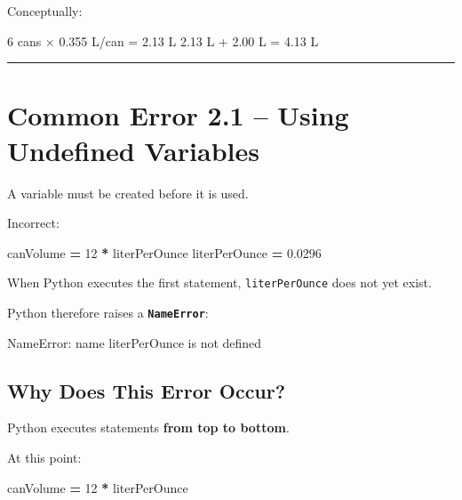 \documentclass[
]{article}
\newenvironment{Shaded}{\begin{snugshade}}{\end{snugshade}}
\newcommand{\DecValTok}[1]{\textcolor[rgb]{0.00,0.00,0.81}{#1}}
\newcommand{\FloatTok}[1]{\textcolor[rgb]{0.00,0.00,0.81}{#1}}
\newcommand{\NormalTok}[1]{#1}
\newcommand{\OperatorTok}[1]{\textcolor[rgb]{0.81,0.36,0.00}{\textbf{#1}}}
\begin{document}
Conceptually:

\begin{Shaded}
\begin{Highlighting}[]
\NormalTok{6 cans × 0.355 L/can = 2.13 L}
\NormalTok{2.13 L + 2.00 L       = 4.13 L}
\end{Highlighting}
\end{Shaded}

\begin{center}\rule{0.5\linewidth}{0.5pt}\end{center}

\section{Common Error 2.1 -- Using Undefined
Variables}\label{common-error-2.1-using-undefined-variables}

A variable must be created before it is used.

Incorrect:

\begin{Shaded}
\begin{Highlighting}[]
\NormalTok{canVolume }\OperatorTok{=} \DecValTok{12} \OperatorTok{*}\NormalTok{ literPerOunce}
\NormalTok{literPerOunce }\OperatorTok{=} \FloatTok{0.0296}
\end{Highlighting}
\end{Shaded}

When Python executes the first statement, \texttt{literPerOunce} does
not yet exist.

Python therefore raises a \textbf{\texttt{NameError}}:

\begin{Shaded}
\begin{Highlighting}[]
\NormalTok{NameError: name \textquotesingle{}literPerOunce\textquotesingle{} is not defined}
\end{Highlighting}
\end{Shaded}

\subsection{Why Does This Error Occur?}\label{why-does-this-error-occur}

Python executes statements \textbf{from top to bottom}.

At this point:

\begin{Shaded}
\begin{Highlighting}[]
\NormalTok{canVolume }\OperatorTok{=} \DecValTok{12} \OperatorTok{*}\NormalTok{ literPerOunce}
\end{Highlighting}
\end{Shaded}
\end{document}
